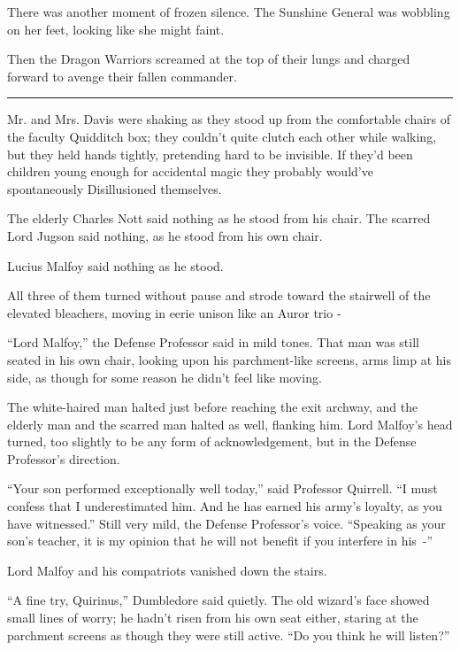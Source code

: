 There was another moment of frozen silence. The Sunshine General was wobbling on her feet, looking like she might faint.

Then the Dragon Warriors screamed at the top of their lungs and charged forward to avenge their fallen commander.

\begin{center}\rule{3in}{0.4pt}\end{center}

Mr. and Mrs. Davis were shaking as they stood up from the comfortable chairs of the faculty Quidditch box; they couldn't quite clutch each other while walking, but they held hands tightly, pretending hard to be invisible. If they'd been children young enough for accidental magic they probably would've spontaneously Disillusioned themselves.

The elderly Charles Nott said nothing as he stood from his chair. The scarred Lord Jugson said nothing, as he stood from his own chair.

Lucius Malfoy said nothing as he stood.

All three of them turned without pause and strode toward the stairwell of the elevated bleachers, moving in eerie unison like an Auror trio -

``Lord Malfoy,'' the Defense Professor said in mild tones. That man was still seated in his own chair, looking upon his parchment-like screens, arms limp at his side, as though for some reason he didn't feel like moving.

The white-haired man halted just before reaching the exit archway, and the elderly man and the scarred man halted as well, flanking him. Lord Malfoy's head turned, too slightly to be any form of acknowledgement, but in the Defense Professor's direction.

``Your son performed exceptionally well today,'' said Professor Quirrell. ``I must confess that I underestimated him. And he has earned his army's loyalty, as you have witnessed.'' Still very mild, the Defense Professor's voice. ``Speaking as your son's teacher, it is my opinion that he will not benefit if you interfere in his~-''

Lord Malfoy and his compatriots vanished down the stairs.

``A fine try, Quirinus,'' Dumbledore said quietly. The old wizard's face showed small lines of worry; he hadn't risen from his own seat either, staring at the parchment screens as though they were still active. ``Do you think he will listen?''

